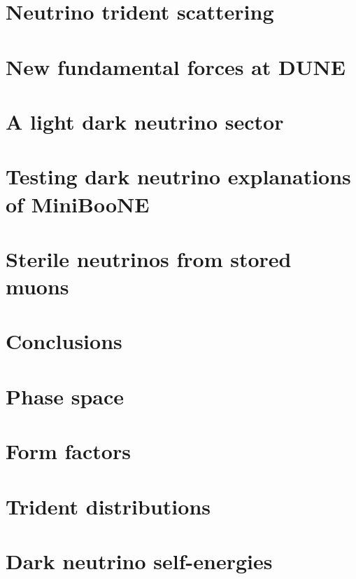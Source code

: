 \documentclass[openany,twoside,frontopenright,chaprunninghead]{ip3thesis}
\begin{document}
\chapter{Neutrino trident scattering}


\chapter{New fundamental forces at DUNE}


\chapter{A light dark neutrino sector}


\chapter{Testing dark neutrino explanations of MiniBooNE }


\chapter{Sterile neutrinos from stored muons}


\chapter{Conclusions}


\begin{appendices}
\chapter{Phase space}\label{app:phase_space}


\chapter{Form factors}\label{app:formfactors}


\chapter{Trident distributions}\label{app:trident_distributions}



\chapter{Dark neutrino self-energies}\label{app:loop_masses}

\end{appendices}



\end{document}
